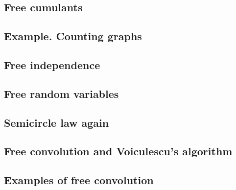\documentclass[letterpaper,11pt,oneside,reqno]{amsart}
\numberwithin{equation}{section}
\theoremstyle{definition}
\begin{document}

\subsection{Free cumulants} %
\label{sub:free_cumulants}




\subsection{Example. Counting graphs} %
\label{sub:example_counting_graphs}


\subsection{Free independence} %
\label{sub:free_independence}


\subsection{Free random variables} %
\label{sub:free_random_variables}


\subsection{Semicircle law again} %
\label{sub:semicircle_law_again}


\subsection{Free convolution and Voiculescu's algorithm} %
\label{sub:free_convolution_and_voiculescu_s_algorithm}


\subsection{Examples of free convolution} %
\label{sub:examples_of_free_convolutions}
\end{document}
